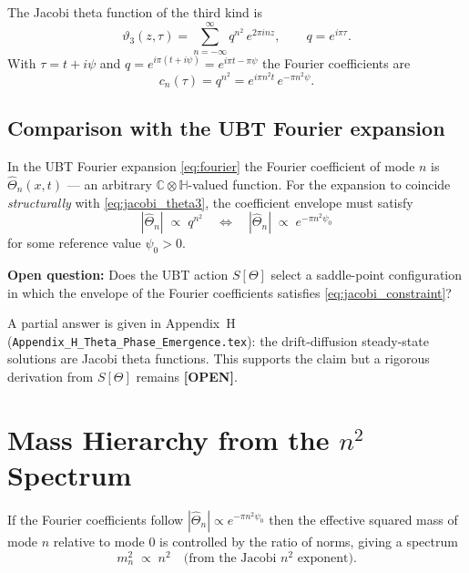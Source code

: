 \documentclass[12pt,a4paper]{article}
\theoremstyle{remark}
\newcommand{\C}{\mathbb{C}}
\newcommand{\H}{\mathbb{H}}
\newcommand{\varthree}{\vartheta_3}
\begin{document}
The Jacobi theta function of the third kind is
\begin{equation}
  \label{eq:jacobi_theta3}
  \varthree(z,\tau)
  = \sum_{n=-\infty}^{\infty} q^{n^2}\,e^{2\pi inz},
  \qquad q = e^{i\pi\tau}.
\end{equation}
With $\tau = t + i\psi$ and $q = e^{i\pi(t+i\psi)} = e^{i\pi t-\pi\psi}$
the Fourier coefficients are
\begin{equation}
  \label{eq:jacobi_coeff}
  c_n(\tau) = q^{n^2} = e^{i\pi n^2 t}\,e^{-\pi n^2\psi}.
\end{equation}

\subsection{Comparison with the UBT Fourier expansion}

In the UBT Fourier expansion \eqref{eq:fourier} the Fourier coefficient
of mode $n$ is $\hat\Theta_n(x,t)$ — an arbitrary $\C\otimes\H$-valued
function.  For the expansion to coincide \emph{structurally} with
\eqref{eq:jacobi_theta3}, the coefficient envelope must satisfy
\begin{equation}
  \label{eq:jacobi_constraint}
  |\hat\Theta_n| \;\propto\; q^{n^2}
  \quad\Longleftrightarrow\quad
  |\hat\Theta_n| \;\propto\; e^{-\pi n^2\psi_0}
\end{equation}
for some reference value $\psi_0 > 0$.

\textbf{Open question:}  Does the UBT action $S[\Theta]$ select a
saddle-point configuration in which the envelope of the Fourier
coefficients satisfies \eqref{eq:jacobi_constraint}?

A partial answer is given in Appendix~H (\texttt{Appendix\_H\_Theta\_Phase\_Emergence.tex}): the drift-diffusion steady-state
solutions are Jacobi theta functions.  This supports the claim but a
rigorous derivation from $S[\Theta]$ remains \textbf{[OPEN]}.

\section{Mass Hierarchy from the $n^2$ Spectrum}
\label{sec:mass_n2}

If the Fourier coefficients follow $|\hat\Theta_n|\propto e^{-\pi n^2\psi_0}$
then the effective squared mass of mode $n$ relative to mode $0$ is
controlled by the ratio of norms, giving a spectrum
\begin{equation}
  \label{eq:n2_spectrum}
  m_n^2 \;\propto\; n^2
  \quad\text{(from the Jacobi $n^2$ exponent)}.
\end{equation}
\end{document}
